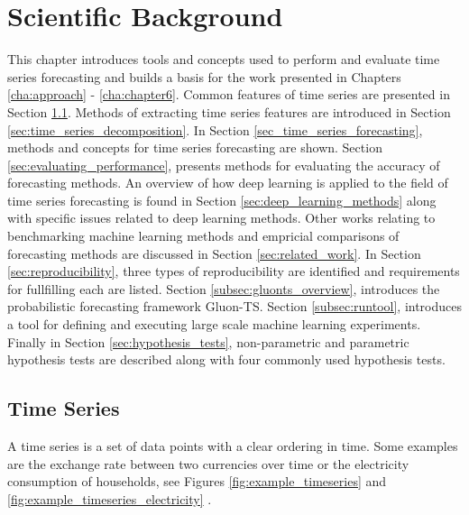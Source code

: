 \chapter{Scientific Background}
\label{cha:chapter2}
This chapter introduces tools and concepts used to perform and evaluate time series forecasting and builds a basis for the work presented in Chapters \ref{cha:approach} - \ref{cha:chapter6}. Common features of time series are presented in Section \ref{sec:ts}. Methods of extracting time series features are introduced in Section \ref{sec:time_series_decomposition}. In Section \ref{sec_time_series_forecasting}, methods and concepts for time series forecasting are shown. Section \ref{sec:evaluating_performance}, presents methods for evaluating the accuracy of forecasting methods. An overview of how deep learning is applied to the field of time series forecasting is found in Section \ref{sec:deep_learning_methods} along with specific issues related to deep learning methods. Other works relating to benchmarking machine learning methods and empricial comparisons of forecasting methods are discussed in Section \ref{sec:related_work}. In Section \ref{sec:reproducibility}, three types of reproducibility are identified and requirements for fullfilling each are listed. Section \ref{subsec:gluonts_overview}, introduces the probabilistic forecasting framework Gluon-TS. Section \ref{subsec:runtool}, introduces a tool for defining and executing large scale machine learning experiments. Finally in Section \ref{sec:hypothesis_tests}, non-parametric and parametric hypothesis tests are described along with four commonly used hypothesis tests.

\section{Time Series}
\label{sec:ts}
A time series is a set of data points with a clear ordering in time. Some examples are the exchange rate between two currencies over time or the electricity consumption of households, see Figures \ref{fig:example_timeseries} and \ref{fig:example_timeseries_electricity} \cite{gluonts_paper}.


